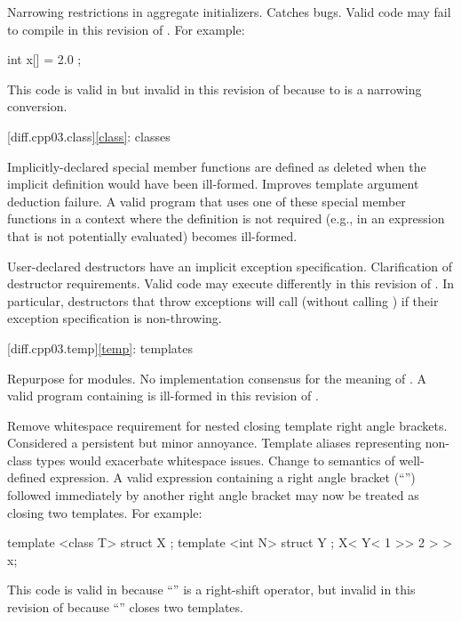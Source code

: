 \change
Narrowing restrictions in aggregate initializers.
\rationale
Catches bugs.
\effect
Valid \CppIII{} code may fail to compile in this revision of \Cpp{}.
For example:
\begin{codeblock}
int x[] = { 2.0 };
\end{codeblock}
This code is valid in \CppIII{} but invalid in this
revision of \Cpp{} because  to  is a narrowing
conversion.

[diff.cpp03.class]{\ref{class}: classes}

\change
Implicitly-declared special member functions are defined as deleted
when the implicit definition would have been ill-formed.
\rationale
Improves template argument deduction failure.
\effect
A valid \CppIII{} program that uses one of these special member functions in a
context where the definition is not required (e.g., in an expression that is
not potentially evaluated) becomes ill-formed.

\change
User-declared destructors have an implicit exception specification.
\rationale
Clarification of destructor requirements.
\effect
Valid \CppIII{} code may execute differently in this revision of \Cpp{}. In
particular, destructors that throw exceptions will call 
(without calling ) if their exception specification is
non-throwing.

[diff.cpp03.temp]{\ref{temp}: templates}

\change
Repurpose  for modules.
\rationale
No implementation consensus for the \CppIII{} meaning of .
\effect
A valid \CppIII{} program containing  is ill-formed in this
revision of \Cpp{}.

\change
Remove whitespace requirement for nested closing template right angle
brackets.
\rationale
Considered a persistent but minor annoyance. Template aliases
representing non-class types would exacerbate whitespace issues.
\effect
Change to semantics of well-defined expression. A valid \CppIII{} expression
containing a right angle bracket (``\tcode{>}'') followed immediately by
another right angle bracket may now be treated as closing two templates.
For example:
\begin{codeblock}
template <class T> struct X { };
template <int N> struct Y { };
X< Y< 1 >> 2 > > x;
\end{codeblock}
This code is valid in \CppIII{} because ``\tcode{>>}''
is a right-shift operator, but invalid in this revision of \Cpp{} because
``\tcode{>>}'' closes two templates.

